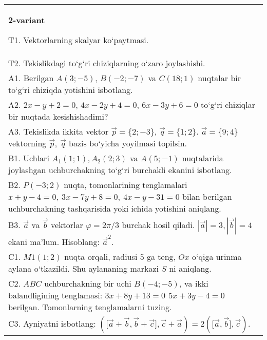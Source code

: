 \documentclass{article}
\begin{document}
\begin{tabular}{m{17cm}}
\textbf{2-variant}
\newline

T1. 
Vektorlarning skalyar ko‘paytmasi.
 \\
T2. 
Tekislikdagi to‘g‘ri chiziqlarning o‘zaro joylashishi.
 \\
A1. 
Berilgan $A (3; -5) $, $B (-2; -7)$ va
$C (18; 1) $ nuqtalar bir to‘g‘ri chiziqda yotishini isbotlang.
 \\
A2. 
$2x-y+2=0$, $4x-2y+4=0$, $6x-3y+6=0$
to‘g‘ri chiziqlar bir nuqtada kesishishadimi?
 \\
A3. 
Tekislikda ikkita vektor
$\overrightarrow{p} = \{ 2; - 3\}$, $\overrightarrow{q} = \{ 1;2\}$.
$\overrightarrow{a} = \{9;4\}$ vektorning
$\overrightarrow{p},\ \overrightarrow{q}$ bazis bo‘yicha yoyilmasi topilsin.
 \\
B1. 
Uchlari $A_1 (1; 1), A_2 (2; 3) $ va $A (5;-1) $
nuqtalarida joylashgan uchburchakning to‘g‘ri burchakli ekanini isbotlang.
 \\
B2. 
\(P (-3;2) \) nuqta, tomonlarining tenglamalari
\(x+y-4=0,\ 3x-7y+8=0,\ 4x-y-31=0\) bilan
berilgan uchburchakning tashqarisida yoki ichida yotishini aniqlang.
 \\
B3. 
$\vec{a}$ va $\vec{b}$ vektorlar $\varphi = 2\pi/3$ burchak hosil qiladi. $|\vec{a}| = 3,|\vec{b}| = 4$ ekani ma’lum. Hisoblang:
${\vec{a}}^{2}$.
 \\
C1. 
\(M{1} (1; 2) \) nuqta orqali, radiusi 5 ga teng,
$Ox$ o‘qiga urinma aylana o‘tkazildi. Shu aylananing markazi
$S$ ni aniqlang.
 \\
C2. 
$ABC$ uchburchakning bir uchi \(B (- 4; - 5) \),
va ikki balandligining tenglamasi:
\(3x + 8y + 13 = 0\,\ 5x + 3y - 4 = 0\) berilgan. Tomonlarning
tenglamalarni tuzing.
 \\
C3. 
Ayniyatni isbotlang: \((\lbrack\vec{a} + \vec{b},\vec{b} + \vec{c}\rbrack,\vec{c} + \vec{a}) = 2 (\lbrack\vec{a},\vec{b}\rbrack,\vec{c}) \).
 \\

\end{tabular}
\vspace{1cm}
\end{document}

